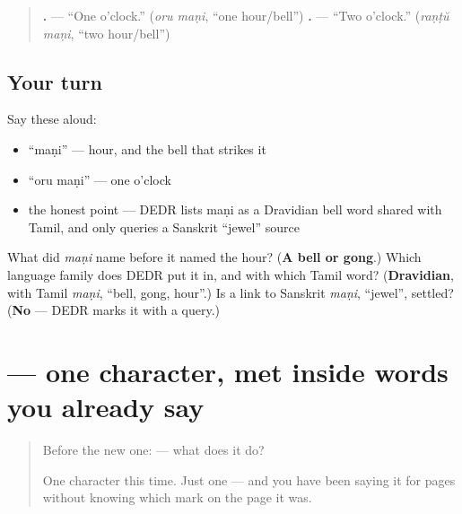 \begin{grammarlens}[title={Grammar Lens: telling the time}]
\begin{quote}
\textbf{ .} — \textquotedblleft{}One o'clock.\textquotedblright{} (\emph{oru maṇi}, \textquotedblleft{}one hour/bell\textquotedblright{}) \textbf{ .} — \textquotedblleft{}Two o'clock.\textquotedblright{} (\emph{raṇṭŭ maṇi}, \textquotedblleft{}two hour/bell\textquotedblright{})
\end{quote}
\end{grammarlens}

\subsection*{Your turn}
Say these aloud:

\begin{itemize}
\raggedright
  \item \textquotedblleft{}maṇi\textquotedblright{} — hour, and the bell that strikes it
  \item \textquotedblleft{}oru maṇi\textquotedblright{} — one o'clock
  \item the honest point — DEDR lists maṇi as a Dravidian bell word shared with Tamil, and only queries a Sanskrit \textquotedblleft{}jewel\textquotedblright{} source
\end{itemize}

\begin{tcolorbox}[breakable,colback=teal!4,colframe=teal!35!black,title={Before you move on}]
What did \emph{maṇi} name before it named the hour? (\textbf{A bell or gong}.) Which language family does DEDR put it in, and with which Tamil word? (\textbf{Dravidian}, with Tamil \emph{maṇi}, \textquotedblleft{}bell, gong, hour\textquotedblright{}.) Is a link to Sanskrit \emph{maṇi}, \textquotedblleft{}jewel\textquotedblright{}, settled? (\textbf{No} — DEDR marks it with a query.)
\end{tcolorbox}
\section[\texorpdfstring{\ml{ഷ} (ṣa)}{ഷ (ṣa)}]{ — one character, met inside words you already say}

\label{lesson:ML-S121-letter-ssa}



\begin{quote}
Before the new one:  — what does it do?

One character this time. Just one — and you have been saying it for pages without knowing which mark on the page it was.
\end{quote}

